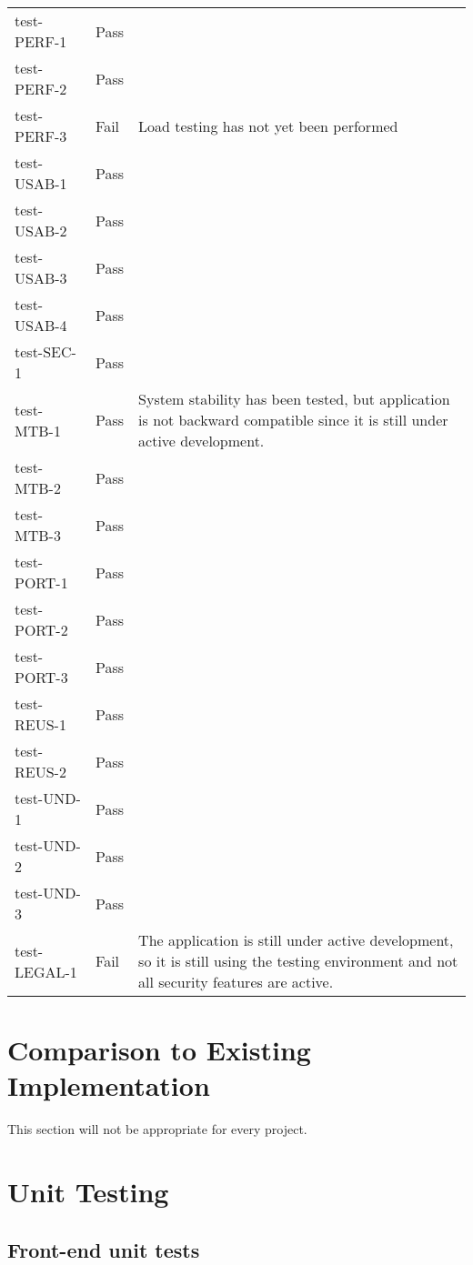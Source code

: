 \documentclass[12pt, titlepage]{article}
\begin{document}
\begin{longtable}{>{\centering\arraybackslash}p{} >{\centering\arraybackslash}p{} >{\centering\arraybackslash}p{}}
    test-PERF-1 & Pass &  \\
    test-PERF-2 & Pass &  \\
    test-PERF-3 & Fail & Load testing has not yet been performed \\
    \midrule
    test-USAB-1 & Pass &  \\
    test-USAB-2 & Pass &  \\
    test-USAB-3 & Pass &  \\
    test-USAB-4 & Pass &  \\
    \midrule
    test-SEC-1 & Pass &  \\
    \midrule
    test-MTB-1 & Pass & System stability has been tested, but application is not
    backward compatible since it is still under active development. \\
    test-MTB-2 & Pass &  \\
    test-MTB-3 & Pass &  \\
    \midrule
    test-PORT-1 & Pass &  \\
    test-PORT-2 & Pass &  \\
    test-PORT-3 & Pass &  \\
    \midrule
    test-REUS-1 & Pass &  \\
    test-REUS-2 & Pass &  \\
    \midrule
    test-UND-1 & Pass &  \\
    test-UND-2 & Pass &  \\
    test-UND-3 & Pass &  \\
    \midrule
    test-LEGAL-1 & Fail & The application is still under active development, so
    it is still using the testing environment and not all security features are
    active. \\
    \bottomrule
\end{longtable}


	
\section{Comparison to Existing Implementation}	

This section will not be appropriate for every project.

\section{Unit Testing}

\subsection{Front-end unit tests}
\end{document}

